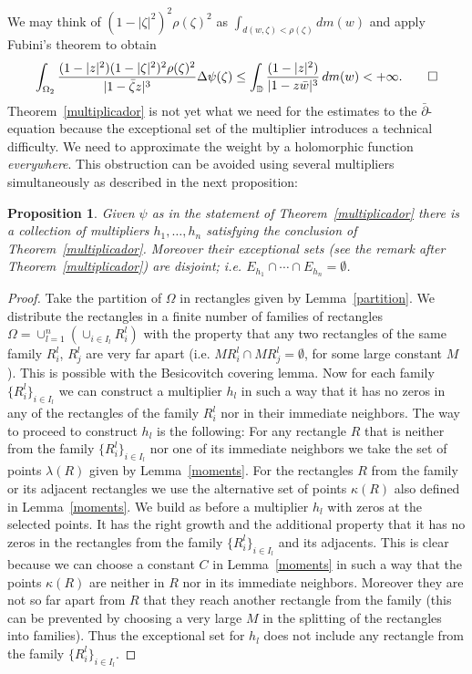 \documentclass[12pt,twoside,final,psamsfonts]{amsart}
\theoremstyle{plain}
\newtheorem{prop}{Proposition}
\theoremstyle{remark}
\theoremstyle{definition}
\newcommand{\D}{{\mathbb D}}
\begin{document}
We may think of $(1-|\zeta|^2)^2\rho(\zeta)^2$ as
$\int_{d(w,\zeta)<\rho(\zeta)}dm(w)$ and apply Fubini's theorem to obtain 
\[
\int_{\Omega_2}\frac{(1-|z|^2) (1-|\zeta|^2)^2\rho(\zeta)^2}{|1-\bar\zeta z|^3}
\Delta\psi(\zeta)\le \int_{\D} \frac{(1-|z|^2)}{|1-z\bar w|^3}\, dm(w)<+\infty.
\qed
\]
Theorem~\ref{multiplicador} is not yet what we need for the estimates to the
$\bar\partial$-equation because the exceptional set of the multiplier introduces
a technical difficulty. We need to approximate the weight by a holomorphic
function \emph{everywhere}. This obstruction 
can be avoided using several multipliers
simultaneously as
described in the next proposition:
\begin{prop}\label{tecnic} Given $\psi$ as in the statement of
Theorem~\ref{multiplicador} there is a
collection of multipliers $h_1,\ldots,h_n$ satisfying the conclusion of
Theorem~\ref{multiplicador}. Moreover their exceptional sets 
(see the remark after
Theorem~\ref{multiplicador}) are disjoint; i.e.
$E_{h_1}\cap\cdots\cap E_{h_n}=\emptyset$. 
\end{prop}
\begin{proof}
Take the partition of $\Omega$ in rectangles given by Lemma~\ref{partition}. We
distribute the rectangles in a finite number of families of rectangles
$\Omega=\cup_{l=1}^n(\cup_{i\in I_l}R^l_i)$ with the property that any two
rectangles of the same family $R_i^l$, $R_j^l$ are very far apart (i.e.
$M R_i^l\cap M R_j^l=\emptyset$, for some large constant $M$). This is possible
with the Besicovitch covering lemma. Now for each family $\{R^l_i\}_{i\in I_l}$
we can construct a multiplier $h_l$ in such a way that it has no zeros in any of
the rectangles of the family $R^l_i$ nor in their immediate neighbors. 
The way to proceed to construct $h_l$ is the following: For any rectangle
$R$ 
that is neither from the family $\{R^l_i\}_{i\in I_l}$ nor one of its immediate
neighbors we take the set of points $\lambda(R)$ given by Lemma~\ref{moments}.
For the rectangles $R$ from the family or its adjacent rectangles we use the
alternative set of points $\kappa(R)$ also defined in Lemma~\ref{moments}.
We build as before a multiplier $h_l$ with zeros at the selected points. 
It has the right growth and the
additional property that it has no zeros in the rectangles from the family 
$\{R^l_i\}_{i\in I_l}$ and
its adjacents. This is clear because we can choose a constant $C$ in
Lemma~\ref{moments} in such a way that the points $\kappa(R)$ are neither in $R$
nor in its immediate neighbors. 
Moreover they are not so far apart from $R$ that they reach another
rectangle from the family 
(this can be prevented by choosing a very large $M$ in
the splitting of the rectangles into families). Thus the exceptional set for
$h_l$ does not include any rectangle from the family $\{R^l_i\}_{i\in I_l}$.
\end{proof}
\end{document}
